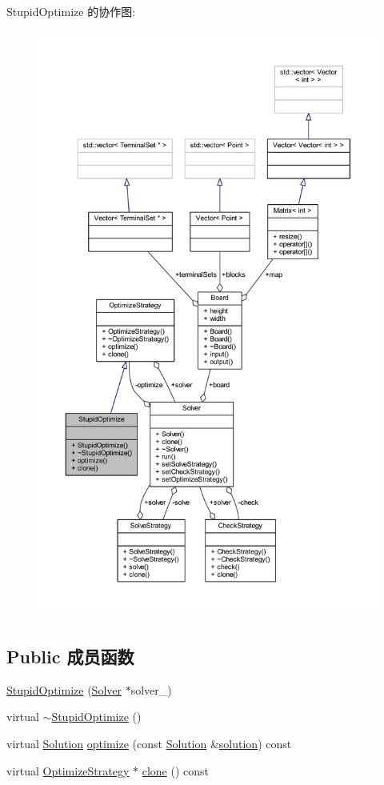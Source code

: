 Stupid\+Optimize 的协作图\+:
\nopagebreak
\begin{figure}[H]
\begin{center}
\leavevmode
\includegraphics[height=550pt]{classStupidOptimize__coll__graph}
\end{center}
\end{figure}
\subsection*{Public 成员函数}
\begin{DoxyCompactItemize}
\item 
\hyperlink{classStupidOptimize_a33514f9f829ac93cc524b37ce55922e7}{Stupid\+Optimize} (\hyperlink{classSolver}{Solver} $\ast$solver\+\_\+)
\item 
virtual \hyperlink{classStupidOptimize_aab5bc971dccd2b70e6ae07dc3ecc6ba6}{$\sim$\+Stupid\+Optimize} ()
\item 
virtual \hyperlink{classSolution}{Solution} \hyperlink{classStupidOptimize_a6a3817a3c94145c676b31aa7e778669f}{optimize} (const \hyperlink{classSolution}{Solution} \&\hyperlink{classes_8txt_aa43d5190bbc491d9c9134146e01a248e}{solution}) const 
\item 
virtual \hyperlink{classOptimizeStrategy}{Optimize\+Strategy} $\ast$ \hyperlink{classStupidOptimize_a112d117092ca22231f28729fcad8f71b}{clone} () const 
\end{DoxyCompactItemize}

